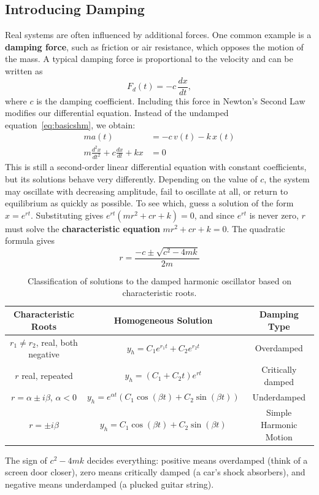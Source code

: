 \subsection{Introducing Damping}
Real systems are often influenced by additional forces. One common example is a
\textbf{damping force}, such as friction or air resistance, which opposes the motion
of the mass. A typical damping force is proportional to the velocity and can
be written as
\[
	F_{d}(t) = -c\,\frac{dx}{dt},
\]
where $c$ is the damping coefficient. Including this force in Newton's Second Law modifies our differential equation. Instead of the undamped equation~\eqref{eq:basicshm},
we obtain:
\begin{align}
	m a(t)                                     & = -c\,v(t) - k\,x(t) \label{eq:forcebalance} \\
	m\frac{d^{2}x}{dt^{2}}+ c\frac{dx}{dt}+ kx & = 0 \label{eq:dampedmassspring}
\end{align}
This is still a second-order linear differential equation with constant coefficients, but its solutions behave very differently. Depending on the value of $c$,
the system may oscillate with decreasing amplitude, fail to oscillate at all,
or return to equilibrium as quickly as possible. To see which, guess a solution of the form $x = e^{rt}$. Substituting gives
$e^{rt}(mr^2 + cr + k) = 0$, and since $e^{rt}$ is never zero, $r$ must solve
the \textbf{characteristic equation}
$mr^2 + cr + k = 0$. The quadratic formula gives
\[
	r = \frac{-c \pm \sqrt{c^{2}- 4mk}}{2m}
\]
\begin{table}[H]
	\centering
	\begin{tabular}{|c|c|c|}
		\hline
		\textbf{Characteristic Roots}               & \textbf{Homogeneous Solution}                                                 & \textbf{Damping Type}  \\
		\hline
		$r_{1}\neq r_{2}$, real, both negative & $y_{h}= C_{1}e^{r_1 t}+ C_{2}e^{r_2 t}$                                       & Overdamped             \\
		\hline
		$r$ real, repeated                          & $y_{h}= (C_{1}+ C_{2}t)e^{rt}$                                                & Critically damped      \\
		\hline
		$r = \alpha \pm i\beta$, $\alpha < 0$       & $y_{h}= e^{\alpha t}\!\left( C_{1}\cos(\beta t) + C_{2}\sin(\beta t) \right)$ & Underdamped            \\
		\hline
		$r = \pm i \beta$                           & $y_{h}= C_{1}\cos(\beta t) + C_{2}\sin(\beta t)$                              & Simple Harmonic Motion \\
		\hline
	\end{tabular}
	\caption{Classification of solutions to the damped harmonic oscillator based
	on characteristic roots.}
\end{table}
The sign of $c^2 - 4mk$ decides everything: positive means overdamped (think
of a screen door closer), zero means critically damped (a car's shock
absorbers), and negative means underdamped (a plucked guitar string).

